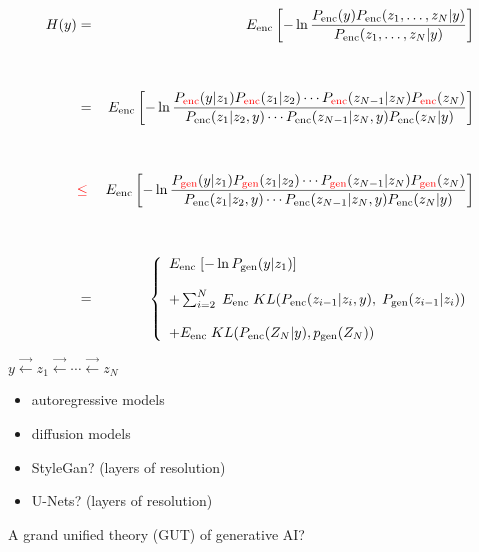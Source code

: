 {

{\Large
\begin{eqnarray*}
H(y) & = & E_{\mathrm{enc}}\left[- \ln\frac{P_{\mathrm{enc}}(y)P_{\mathrm{enc}}(z_1,\ldots,z_N|y)}{P_{\mathrm{enc}}(z_1,\ldots,z_N|y)}\right]\\
  \\
  \\
  & = & E_{\mathrm{enc}}\left[ - \ln\frac{P_{\color{red} \mathrm{enc}}(y|z_1)P_{\color{red} \mathrm{enc}}(z_1|z_2)\cdots P_{\color{red} \mathrm{enc}}(z_{N-1}|z_N)P_{\color{red} \mathrm{enc}}(z_N)}
  {P_{\mathrm{enc}}(z_1|z_2,y)\cdots P_{\mathrm{enc}}(z_{N-1}|z_N,y)P_{\mathrm{enc}}(z_N|y)}\right] \\
   \\
   \\
  & {\color{red} \leq} & E_{\mathrm{enc}}\left[ - \ln\frac{P_{\color{red} \mathrm{gen}}(y|z_1)P_{\color{red} \mathrm{gen}}(z_1|z_2)\cdots P_{\color{red} \mathrm{gen}}(z_{N-1}|z_N)P_{\color{red} \mathrm{gen}}(z_N)}
  {P_{\mathrm{enc}}(z_1|z_2,y)\cdots P_{\mathrm{enc}}(z_{N-1}|z_N,y)P_{\mathrm{enc}}(z_N|y)}\right] \\
\\
\\
 & = & \left\{\begin{array}{l}E_{\mathrm{enc}}\;[-\ln P_{\mathrm{gen}}(y|z_1)]
                             \\ \\ + \sum_{i=2}^N  \; E_{\mathrm{enc}}\; KL(P_{\mathrm{enc}}(z_{i-1}|z_i,y),\;P_{\mathrm{gen}}(z_{i-1}|z_i)) \\
                             \\ + E_{\mathrm{enc}}\; KL(P_{\mathrm{enc}}(Z_N|y),p_{\mathrm{gen}}(Z_N))\end{array}\right.
\end{eqnarray*}
}


\centerline{$y \stackrel{\rightarrow}{\leftarrow} z_1  \stackrel{\rightarrow}{\leftarrow} \cdots \stackrel{\rightarrow}{\leftarrow} z_N$}

\vfill
\begin{itemize}
\item autoregressive models

\vfill
\item diffusion models

\vfill
\item StyleGan? (layers of resolution)

\vfill
\item U-Nets? (layers of resolution)
\end{itemize}

\vfill
A grand unified theory (GUT) of generative AI?

}
